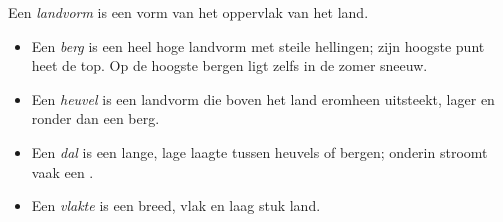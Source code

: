 \begin{definition}[Landvormen]\label{def:g1:landscapes-around-us:landform}
Een \emph{landvorm} is een vorm van het oppervlak van het land.
\begin{itemize}
  \item Een \emph{berg} is een heel hoge landvorm met steile
        hellingen; zijn hoogste punt heet de top. Op de hoogste bergen
        ligt zelfs in de zomer sneeuw.
  \item Een \emph{heuvel} is een landvorm die boven het land
        eromheen uitsteekt, lager en ronder dan een berg.
  \item Een \emph{dal} is een lange, lage laagte tussen heuvels
        of bergen; onderin stroomt vaak een .
  \item Een \emph{vlakte} is een breed, vlak en laag stuk land.
\end{itemize}
\end{definition}

